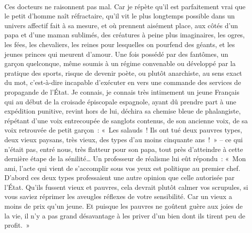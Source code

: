 \documentclass[french,twoside]{book} %
\newcommand{\astertri}{\medskip\par\centerline{\color{rubric}\large\selectfont{\syms ✻\,✻\,✻}}\medskip\par}%
\begin{document}
\noindent  \par
Ces docteurs ne raisonnent pas mal. Car je répète qu’il est parfaitement vrai que le petit d’homme naît réfractaire, qu’il vit le plus longtemps possible dans un univers affectif fait à sa mesure, et où prennent aisément place, aux côtés d’un papa et d’une maman sublimés, des créatures à peine plus imaginaires, les ogres, les fées, les chevaliers, les reines pour lesquelles on pourfend des géants, et les jeunes princes qui meurent d’amour. Une fois possédé par des fantômes, un garçon quelconque, même soumis à un régime convenable ou développé par la pratique des sports, risque de devenir poète, ou plutôt anarchiste, au sens exact du mot, c’est-à-dire incapable d’exécuter en vers une commande des services de propagande de l’État. Je connais, je connais très intimement un jeune Français qui au début de la croisade épiscopale espagnole, ayant dû prendre part à une expédition punitive, revint hors de lui, déchira sa chemise bleue de phalangiste, répétant d’une voix entrecoupée de sanglots contenus, de son ancienne voix, de sa voix retrouvée de petit garçon : « Les salauds ! Ils ont tué deux pauvres types, deux vieux paysans, très vieux, des types d’au moins cinquante ans ! » – ce qui n’était pas, entré nous, très flatteur pour son papa, tout près d’atteindre à cette dernière étape de la sénilité… Un professeur de réalisme lui eût répondu : « Mon ami, l’acte qui vient de s’accomplir sous vos yeux est politique au premier chef. D’abord ces deux types professaient une autre opinion que celle autorisée par l’État. Qu’ils fussent vieux et pauvres, cela devrait plutôt calmer vos scrupules, si vous saviez réprimer les aveugles réflexes de votre sensibilité. Car un vieux a moins de prix qu’un jeune. Et puisque les pauvres ne goûtent guère aux joies de la vie, il n’y a pas grand désavantage à les priver d’un bien dont ils tirent peu de profit. »\par
 \par

\astertri
\end{document}
